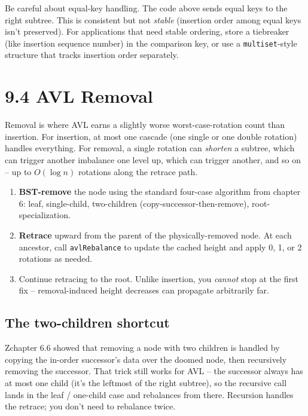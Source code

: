 \documentclass[11pt]{article}
\begin{document}
\begin{warnbox}
Be careful about equal-key handling. The code above sends equal keys to the right subtree. This is consistent but not \emph{stable} (insertion order among equal keys isn't preserved). For applications that need stable ordering, store a tiebreaker (like insertion sequence number) in the comparison key, or use a \texttt{multiset}-style structure that tracks insertion order separately.
\end{warnbox}

\section{9.4 AVL Removal}

Removal is where AVL earns a slightly worse worst-case-rotation count than insertion. For insertion, at most one cascade (one single or one double rotation) handles everything. For removal, a single rotation can \emph{shorten} a subtree, which can trigger another imbalance one level up, which can trigger another, and so on -- up to $O(\log n)$ rotations along the retrace path.

\begin{defnbox}
\begin{enumerate}[leftmargin=*]
    \item \textbf{BST-remove} the node using the standard four-case algorithm from chapter 6: leaf, single-child, two-children (copy-successor-then-remove), root-specialization.
    \item \textbf{Retrace} upward from the parent of the physically-removed node. At each ancestor, call \texttt{avlRebalance} to update the cached height and apply 0, 1, or 2 rotations as needed.
    \item Continue retracing to the root. Unlike insertion, you \emph{cannot} stop at the first fix -- removal-induced height decreases can propagate arbitrarily far.
\end{enumerate}
\end{defnbox}

\subsection*{The two-children shortcut}

Zchapter 6.6 showed that removing a node with two children is handled by copying the in-order successor's data over the doomed node, then recursively removing the successor. That trick still works for AVL -- the successor always has at most one child (it's the leftmost of the right subtree), so the recursive call lands in the leaf / one-child case and rebalances from there. Recursion handles the retrace; you don't need to rebalance twice.
\end{document}
